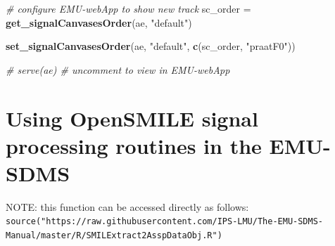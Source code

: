 \documentclass[]{book}
\newenvironment{Shaded}{\begin{snugshade}}{\end{snugshade}}
\newcommand{\CommentTok}[1]{\textcolor[rgb]{0.56,0.35,0.01}{\textit{#1}}}
\newcommand{\KeywordTok}[1]{\textcolor[rgb]{0.13,0.29,0.53}{\textbf{#1}}}
\newcommand{\NormalTok}[1]{#1}
\newcommand{\StringTok}[1]{\textcolor[rgb]{0.31,0.60,0.02}{#1}}
\begin{document}
\begin{Shaded}
\begin{Highlighting}[]
\CommentTok{# configure EMU-webApp to show new track}
\NormalTok{sc_order =}\StringTok{ }\KeywordTok{get_signalCanvasesOrder}\NormalTok{(ae, }\StringTok{"default"}\NormalTok{)}

\KeywordTok{set_signalCanvasesOrder}\NormalTok{(ae, }\StringTok{"default"}\NormalTok{, }\KeywordTok{c}\NormalTok{(sc_order, }\StringTok{"praatF0"}\NormalTok{))}

\CommentTok{# serve(ae) # uncomment to view in EMU-webApp}
\end{Highlighting}
\end{Shaded}

\hypertarget{sec:app-chap-wrassp-opensmileSigProc}{%
\section{Using OpenSMILE signal processing routines in the EMU-SDMS}\label{sec:app-chap-wrassp-opensmileSigProc}}

NOTE: this function can be accessed directly as follows: \texttt{source("https://raw.githubusercontent.com/IPS-LMU/The-EMU-SDMS-Manual/master/R/SMILExtract2AsspDataObj.R")}
\end{document}
